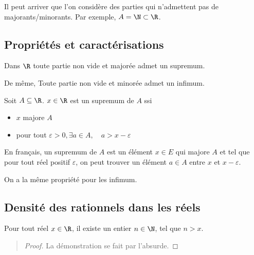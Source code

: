 \begin{example}
    Il peut arriver que l'on considère des parties qui n'admettent pas de majorants/minorants. 
    Par exemple, $A = \N \subset \R$. 
\end{example}

\subsection{Propriétés et caractérisations}

\begin{theorem}[Existence]
    Dans $\R$ toute partie non vide et majorée admet un supremum. 

    De même, {Toute partie non vide et minorée admet un infimum.}
\end{theorem}

\begin{proposition}
    Soit $A \subseteq \R$. $x \in \R$ est un supremum de $A$ ssi 
    \begin{itemize}
        \item $x$ majore $A$
        \item pour tout $\varepsilon > 0, \exists a \in A, \quad a > x - \varepsilon $
    \end{itemize}
    En français, un supremum de $A$ est un élément $x \in E$ qui majore $A$ et tel que pour tout réel 
    positif $\varepsilon$, on peut trouver un élément $a \in A$ entre $x$ et $x - \varepsilon$. 

    On a la même propriété pour les infimum. 
\end{proposition}

\subsection{Densité des rationnels dans les réels}

\begin{prop}[Archimède]
    Pour tout réel $x \in \R$, il existe un entier $n \in \N$, tel que $n > x$. 
\end{prop}

\begin{quote}
    \begin{footnotesize}
        \begin{proof}
            La démonstration se fait par l'absurde. 
        \end{proof}
    \end{footnotesize}
\end{quote}


